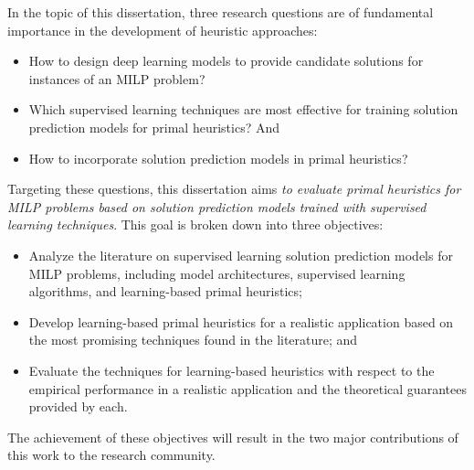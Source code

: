 In the topic of this dissertation, three research questions are of fundamental importance in the development of heuristic approaches:
\begin{itemize}
    \item How to design deep learning models to provide candidate solutions for instances of an MILP problem?
    \item Which supervised learning techniques are most effective for training solution prediction models for primal heuristics? And
    \item How to incorporate solution prediction models in primal heuristics?
\end{itemize}
Targeting these questions, this dissertation aims \emph{to evaluate primal heuristics for MILP problems based on solution prediction models trained with supervised learning techniques}.
This goal is broken down into three objectives:
\begin{itemize}
    \item Analyze the literature on supervised learning solution prediction models for MILP problems, including model architectures, supervised learning algorithms, and learning-based primal heuristics;
    \item Develop learning-based primal heuristics for a realistic application based on the most promising techniques found in the literature; and
    \item Evaluate the techniques for learning-based heuristics with respect to the empirical performance in a realistic application and the theoretical guarantees provided by each.
\end{itemize}
The achievement of these objectives will result in the two major contributions of this work to the research community.

